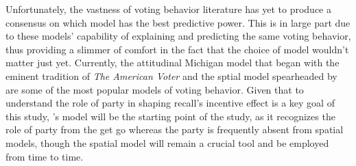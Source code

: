 \documentclass[hyphens, crop=false]{standalone}
\begin{document}
		Unfortunately, the vastness of voting behavior literature has
		yet to produce a consensus on which model has the best predictive power.
		This is in large part due to
		these models' capability of explaining and predicting the same voting behavior,
		thus
		providing a slimmer of comfort in the fact that the choice of model wouldn't matter just yet.
		Currently, the attitudinal Michigan model
		that began with the eminent tradition of \textit{The American Voter}
		\autocite{campbellAmericanVoter1960}
		and the sptial model spearheaded by
		\citeauthor{downsEconomicTheoryDemocracy1957}
		\autocite*{downsEconomicTheoryDemocracy1957}
		are some of the most popular models of voting behavior.
		Given that to understand the role of party in shaping recall's incentive effect is
		a key goal of this study,
		\citeauthor{campbellAmericanVoter1960}'s
		\autocite*{campbellAmericanVoter1960}
		model will be the starting point of the study,
		as it recognizes the role of party from the get go
		whereas the party is frequently absent from spatial models,
		though the spatial model will remain a crucial tool
		and be employed from time to time.
		
\end{document}
